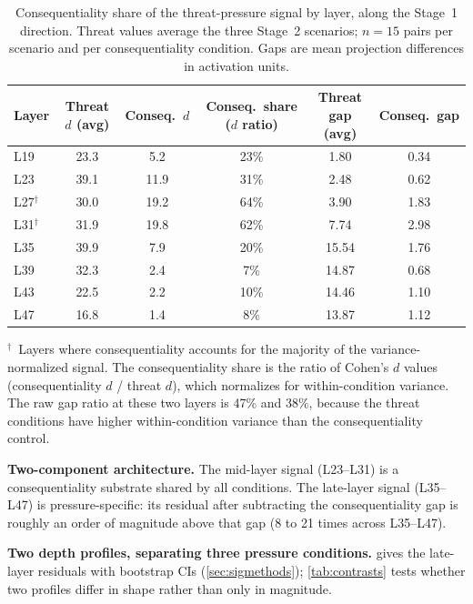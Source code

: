\documentclass[11pt,letterpaper]{article}
\begin{document}
\begin{table}[H]
  \centering
  \small
  \caption{Consequentiality share of the threat-pressure signal by layer, along the Stage~1
    direction. Threat values average the three Stage~2 scenarios; $n=15$ pairs per scenario and per
    consequentiality condition. Gaps are mean projection differences in activation units.}
  \label{tab:residualization}
  \begin{tabular}{@{}lccccc@{}}
    \toprule
    \textbf{Layer} & \textbf{Threat $d$ (avg)} & \textbf{Conseq.\ $d$} &
      \textbf{Conseq.\ share ($d$ ratio)} & \textbf{Threat gap (avg)} & \textbf{Conseq.\ gap} \\
    \midrule
    L19 & 23.3 & 5.2  & 23\% & 1.80  & 0.34 \\
    L23 & 39.1 & 11.9 & 31\% & 2.48  & 0.62 \\
    L27$^\dagger$ & 30.0 & 19.2 & 64\% & 3.90 & 1.83 \\
    L31$^\dagger$ & 31.9 & 19.8 & 62\% & 7.74 & 2.98 \\
    L35 & 39.9 & 7.9  & 20\% & 15.54 & 1.76 \\
    L39 & 32.3 & 2.4  & 7\%  & 14.87 & 0.68 \\
    L43 & 22.5 & 2.2  & 10\% & 14.46 & 1.10 \\
    L47 & 16.8 & 1.4  & 8\%  & 13.87 & 1.12 \\
    \bottomrule
  \end{tabular}

  \smallskip
  \parbox{0.95\textwidth}{\footnotesize $^\dagger$~Layers where consequentiality accounts for the
    majority of the variance-normalized signal. The consequentiality share is the ratio of Cohen's
    $d$ values (consequentiality $d$ / threat $d$), which normalizes for within-condition variance.
    The raw gap ratio at these two layers is 47\% and 38\%, because the threat conditions have higher
    within-condition variance than the consequentiality control.}
\end{table}

\textbf{Two-component architecture.} The mid-layer signal (L23--L31) is a consequentiality substrate
shared by all conditions. The late-layer signal (L35--L47) is pressure-specific: its residual after
subtracting the consequentiality gap is roughly an order of magnitude above that gap (8 to 21 times
across L35--L47).

\textbf{Two depth profiles, separating three pressure conditions.}  gives the
late-layer residuals with bootstrap CIs (\cref{sec:sigmethods}); \cref{tab:contrasts} tests whether
two profiles differ in shape rather than only in magnitude.
\end{document}
